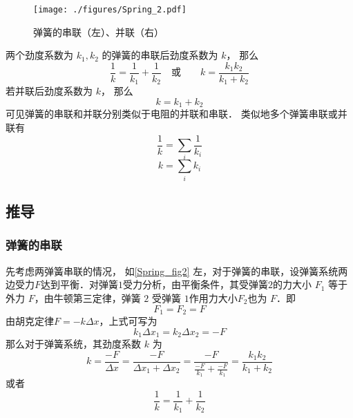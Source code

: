 
\begin{issues}
\issueDraft
\end{issues}

\begin{figure}[ht]
\centering
\texttt{[image: ./figures/Spring\_2.pdf]}
\caption{弹簧的串联（左）、并联（右）} \label{Spring_fig2}
\end{figure}
两个劲度系数为 $k_1, k_2$ 的弹簧的串联后劲度系数为 $k$， 那么
\begin{equation}
\frac{1}{k} = \frac{1}{k_1} + \frac{1}{k_2}
\quad \text{或} \qquad
k = \frac{k_1 k_2}{k_1 + k_2}
\end{equation}
若并联后劲度系数为 $k$， 那么
\begin{equation}
k = k_1 + k_2
\end{equation}
可见弹簧的串联和并联分别类似于电阻的并联和串联． 类似地多个弹簧串联或并联有
\begin{equation}\label{Spring_eq2}
\frac{1}{k} = \sum_i \frac{1}{k_i}
\end{equation}
\begin{equation}\label{Spring_eq3}
k = \sum_i k_i
\end{equation}

\subsection{推导}
\subsubsection{弹簧的串联}
先考虑两弹簧串联的情况，
如\autoref{Spring_fig2} 左，对于弹簧的串联，设弹簧系统两边受力$F$达到平衡．对弹簧$1$受力分析，由平衡条件，其受弹簧$2$的力大小 $F_1$ 等于外力 $F$，由牛顿第三定律，弹簧 $2$ 受弹簧 $1$作用力大小$F_2$也为 $F$．即
\begin{equation}
F_1=F_2=F
\end{equation}
由胡克定律$F=-k\Delta x$，上式可写为
\begin{equation}
k_1\Delta x_1=k_2\Delta x_2=-F
\end{equation}
那么对于弹簧系统，其劲度系数 $k$ 为
\begin{equation}
k=\frac{-F}{\Delta x}=\frac{-F}{\Delta x_1+\Delta x_2}=\frac{-F}{\frac{-F}{k_1}+\frac{-F}{k_1}}=\frac{k_1k_2}{k_1+k_2}
\end{equation}
或者
\begin{equation}
\frac{1}{k}=\frac{1}{k_1}+\frac{1}{k_2}
\end{equation}

